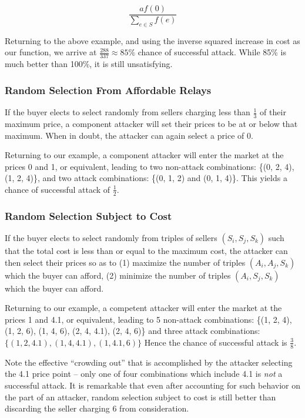 $$\frac{a f(0)}{\sum_{e \in S} f(e)}$$

Returning to the above example, and using the inverse squared increase
in cost as our function, we arrive at $\frac{288}{337} \approx 85\%$
chance of successful attack. While 85\% is much better than 100\%, it
is still unsatisfying.

\subsubsection{Random Selection From Affordable Relays}

If the buyer elects to select randomly from sellers charging less than
$\frac{1}{3}$ of their maximum price, a component attacker will set
their prices to be at or below that maximum. When in doubt, the
attacker can again select a price of 0.

Returning to our example, a component attacker will enter the market
at the prices 0 and 1, or equivalent, leading to two non-attack
combinations: \{(0, 2, 4), (1, 2, 4)\}, and two attack combinations:
\{(0, 1, 2) and (0, 1, 4)\}. This yields a chance of successful attack
of $\frac{1}{2}$.

\subsubsection{Random Selection Subject to Cost}
\label{best-auction-strat}

If the buyer elects to select randomly from triples of sellers $(S_i,
S_j, S_k)$ such that the total cost is less than or equal to the
maximum cost, the attacker can then select their prices so as to (1)
maximize the number of triples $(A_i, A_j, S_k)$ which the buyer can
afford, (2) minimize the number of triples $(A_i, S_j, S_k)$ which the
buyer can afford.

Returning to our example, a competent attacker will enter the market
at the prices 1 and 4.1, or equivalent, leading to 5 non-attack
combinations: \{(1, 2, 4), (1, 2, 6), (1, 4, 6), (2, 4, 4.1), (2, 4,
6)\} and three attack combinations: $\{(1, 2, 4.1), (1, 4, 4.1), (1,
4.1, 6)\}$ Hence the chance of successful attack is $\frac{3}{8}$.

Note the effective ``crowding out'' that is accomplished by the
attacker selecting the 4.1 price point -- only one of four
combinations which include 4.1 is \emph{not} a successful attack. It
is remarkable that even after accounting for such behavior on the part
of an attacker, random selection subject to cost is still better than
discarding the seller charging 6 from consideration.

